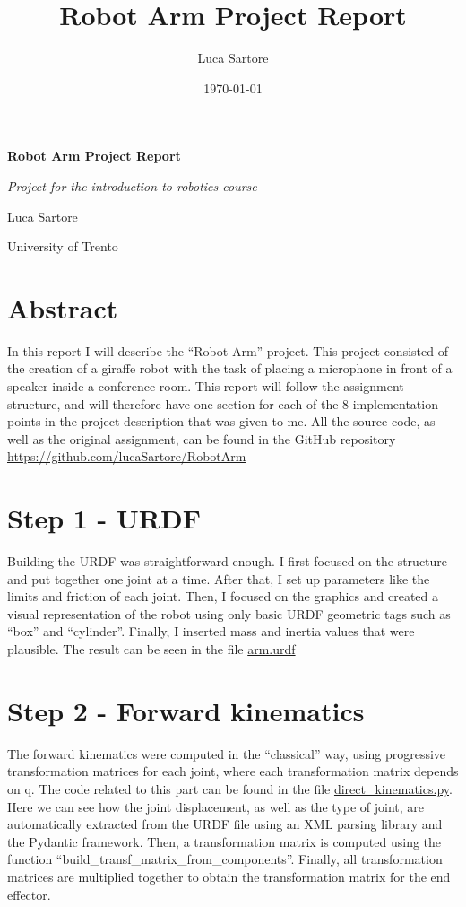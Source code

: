 \documentclass[12pt,a4paper]{article}
\title{Robot Arm Project Report}
\author{Luca Sartore}
\date{\today}
\begin{document}
\begin{titlepage}
    \centering
    \vspace*{1cm}
    {\Huge\textbf{Robot Arm Project Report}\par}
    \vspace{2cm}
    {\Large\textit{Project for the introduction to robotics course}\par}
    \vspace{3cm}
    {\Large Luca Sartore\par}
    \vfill
    University of Trento
    \vspace{1cm}
\end{titlepage}

\tableofcontents
\newpage

\section*{Abstract}
In this report I will describe the ``Robot Arm'' project.
This project consisted of the creation of a giraffe robot with
the task of placing a microphone in front of a speaker inside a conference room.
This report will follow the assignment structure, and will therefore
have one section for each of the 8 implementation points in the 
project description that was given to me.
All the source code, as well as the original assignment, can be found in the 
GitHub repository \url{https://github.com/lucaSartore/RobotArm}


\section{Step 1 - URDF}
Building the URDF was straightforward enough.
I first focused on the structure and put together one joint at a time.
After that, I set up parameters like the limits and friction of each
joint. Then, I focused on the graphics and created a visual representation
of the robot using only basic URDF geometric tags such as ``box'' and 
``cylinder''. Finally, I inserted mass and inertia values that 
were plausible. The result can be seen in the file \href{https://github.com/lucaSartore/RobotArm/blob/master/src/robot_arm/urdf/arm.urdf}{arm.urdf}

\section{Step 2 - Forward kinematics}
The forward kinematics were computed in the ``classical'' way, using 
progressive transformation matrices for each joint, where each transformation
matrix depends on q. The code related to this part can be found in the file
\href{https://github.com/lucaSartore/RobotArm/blob/master/src/robot_arm/src/data_processing/direct_kinematics.py}{direct\_kinematics.py}.
Here we can see how the joint displacement, as well as the type of joint, are automatically
extracted from the URDF file using an XML parsing library and the Pydantic framework. Then,
a transformation matrix is computed using the function ``build\_transf\_matrix\_from\_components''.
Finally, all transformation matrices are multiplied together to obtain the transformation matrix for the end effector.
\end{document}
